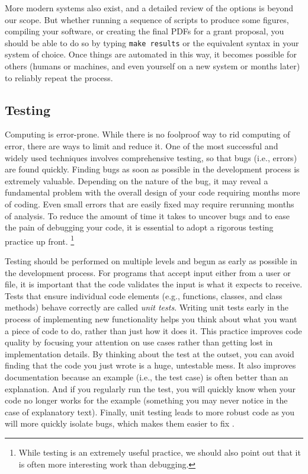\documentclass[ChapterTOCs,krantz2]{krantz} %
\begin{document}
More modern systems also exist, and a detailed review of the options is beyond
our scope.  But whether running a sequence of scripts to produce some figures,
compiling your software, or creating the final PDFs for a grant proposal, you
should be able to do so by typing \texttt{make results} or the equivalent
syntax in your system of choice.  Once things are automated in this way, it
becomes possible for others (humans or machines, and even yourself on a new
system or months later) to reliably repeat the process.

\subsection{Testing}

Computing is error-prone. While there is no foolproof way to rid computing of
error, there are ways to limit and reduce it. One of the most successful and
widely used techniques involves comprehensive testing, so that bugs (i.e.,
errors) are found quickly.  Finding bugs as soon as possible in the development
process is extremely valuable.  Depending on the nature of the bug, it may
reveal a fundamental problem with the overall design of your code requiring
months more of coding.  Even small errors that are easily fixed may require
rerunning months of analysis.  To reduce the amount of time it takes
to uncover bugs and to ease the pain of debugging your code, it is essential to
adopt a rigorous testing practice up front.%
\footnote{While testing is an extremely useful
practice, we should also point out that it is often more interesting work
than debugging.}

Testing should be performed on multiple levels and begun as early as possible
in the development process.  For programs that accept input either from a user
or file, it is important that the code validates the input is what
it expects to receive. Tests that ensure individual code elements (e.g., functions,
classes, and class methods) behave correctly are called \emph{unit tests}. 
Writing unit tests early in the process of implementing new functionality
helps you think about what you want a piece of code to do, rather than just how
it does it. This practice improves code quality by focusing your attention
on use cases rather than getting lost in implementation details. By thinking
about the test at the outset, you can avoid finding that the code you just
wrote is a huge, untestable mess. It also improves documentation because an
example (i.e., the test case) is often better than an explanation. And if you
regularly run the test, you will quickly know when your code no longer works
for the example (something you may never notice in the case of explanatory
text). Finally, unit testing leads to more robust code as you will more quickly
isolate bugs, which makes them easier to fix \cite{oram2010making}.
\end{document}
